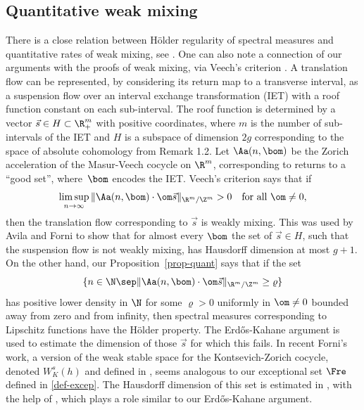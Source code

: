 \subsection{Quantitative weak mixing} There is a close relation between Hölder regularity of spectral measures and quantitative rates of weak mixing, see \cite{BuSo18b,Forni2}. One can also note a connection of our arguments with the proofs of weak mixing, via Veech's criterion \cite{veechamj}. A translation flow can be represented, by considering its return map to a transverse interval, as a suspension flow over an interval exchange transformation (IET) with a roof function constant on each sub-interval. The roof function is determined by a vector $\vec s\in H\subset \R^m_+$ with positive coordinates, where $m$ is the number of sub-intervals of the IET and $H$ is a subspace of dimension $2g$ corresponding to the space of absolute cohomology from Remark 1.2. Let $\Aa(n,\bom)$ be the Zorich acceleration of the Masur-Veech cocycle on $\R^m$, corresponding to returns to a ``good set'', where~$\bom$ encodes the IET. Veech's criterion \cite[\S 7]{veechamj} says that if\vspace*{-3pt}
\[
\limsup_{n\to \infty} \|\Aa(n,\bom)\cdot \om \vec{s}\|_{\R^m/\Z^m}>0\quad \text{for all }\om\ne 0,
\]
then the translation flow corresponding to $\vec s$ is weakly mixing. This was used by Avila and Forni \cite[Th.\,A.2]{AF} to show that for almost every $\bom$ the set of $\vec s\in H$, such that the suspension flow is not weakly mixing, has Hausdorff dimension at most $g+1$. On the other hand, our Proposition~\ref{prop-quant} says that if the set\vspace*{-3pt}
\[
\{n\in \N\sep \|\Aa(n,\bom)\cdot \om \vec{s}\|_{\R^m/\Z^m} \ge \varrho\}
\]
has positive lower density in $\N$ for some $\varrho>0$ uniformly in $\om\ne 0$ bounded away from zero and from infinity, then spectral measures corresponding to Lipschitz functions have the Hölder property. The Erd\H{o}s-Kahane argument is used to estimate the dimension of those $\vec s$ for which this fails.
In recent Forni's work, a version of the weak stable space for the Kontsevich-Zorich cocycle, denoted $W_K^s(h)$ and defined in \cite[\S6]{Forni2}, seems analogous to our exceptional set $\Fre$ defined in \eqref{def-excep}. The Hausdorff dimension of this set is estimated in \cite[Th.\,6.3]{Forni2}, with the help of \cite[Lem.\,6.2]{Forni2}, which plays a role similar to our Erd\H{o}s-Kahane argument.

